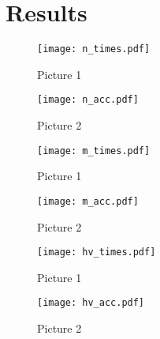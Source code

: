 \section{Results}


\begin{figure*}[hbtp]
    \begin{subfigure}[b]{0.45\textwidth}
          \texttt{[image: n\_times.pdf]}
          \caption{Picture 1}
          \label{fig:1}
    \end{subfigure}
    \hspace{0.05\textwidth}
    \begin{subfigure}[b]{0.45\textwidth}
          \texttt{[image: n\_acc.pdf]}
          \caption{Picture 2}
          \label{fig:2}
    \end{subfigure}
\end{figure*}

\begin{figure*}[hbtp]
    \begin{subfigure}[b]{0.45\textwidth}
          \texttt{[image: m\_times.pdf]}
          \caption{Picture 1}
          \label{fig:1}
    \end{subfigure}
    \hspace{0.05\textwidth}
    \begin{subfigure}[b]{0.45\textwidth}
          \texttt{[image: m\_acc.pdf]}
          \caption{Picture 2}
          \label{fig:2}
    \end{subfigure}
\end{figure*}

\begin{figure*}[hbtp]
    \begin{subfigure}[b]{0.45\textwidth}
          \texttt{[image: hv\_times.pdf]}
          \caption{Picture 1}
          \label{fig:1}
    \end{subfigure}
    \hspace{0.05\textwidth}
    \begin{subfigure}[b]{0.45\textwidth}
          \texttt{[image: hv\_acc.pdf]}
          \caption{Picture 2}
          \label{fig:2}
    \end{subfigure}
\end{figure*}

\balance
